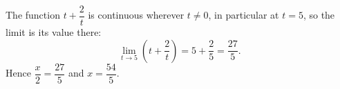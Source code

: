 The function $t+\dfrac{2}{t}$ is continuous wherever $t\ne0$, in particular at $t=5$, so the limit is its value there:
\[\lim_{t\to5}\left(t+\dfrac{2}{t}\right)=5+\dfrac{2}{5}=\dfrac{27}{5}.\]
Hence $\dfrac {x}{2}=\dfrac{27}{5}$ and $x=\boxed{\dfrac{54}{5}}$.

